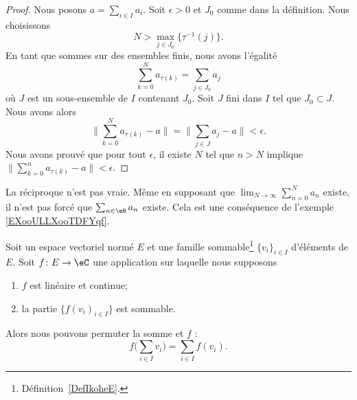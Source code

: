 \begin{proof}
	Nous posons \( a=\sum_{i\in I}a_i\). Soit \( \epsilon>0\) et \( J_0\) comme dans la définition. Nous choisissons
	\begin{equation}
		N>\max_{j\in J_0}\{ \tau^{-1}(j) \}.
	\end{equation}
	En tant que sommes sur des ensembles finis, nous avons l'égalité
	\begin{equation}
		\sum_{k=0}^Na_{\tau(k)}=\sum_{j\in J_0}a_j
	\end{equation}
	où \( J\) est un sous-ensemble de \( I\) contenant \( J_0\). Soit \( J\) fini dans \( I\) tel que \( J_0\subset J\). Nous avons alors
	\begin{equation}
		\| \sum_{k=0}^Na_{\tau(k)}-a \|=\| \sum_{j\in J}a_j-a \|<\epsilon.
	\end{equation}
	Nous avons prouvé que pour tout \( \epsilon\), il existe \( N\) tel que \( n>N\) implique \( \| \sum_{k=0}^na_{\tau(k)}-a\| <\epsilon\).
\end{proof}

La réciproque n'est pas vraie. Même en supposant que \( \lim_{N\to \infty} \sum_{n=0}^Na_n\) existe, il n'est pas forcé que \( \sum_{n\in\eN}a_n\) existe. Cela est une conséquence de l'exemple \ref{EXooULLXooTDFYqf}.


\begin{proposition}     \label{PROPooWLEDooJogXpQ}
	Soit un espace vectoriel normé \( E\) et une famille sommable\footnote{Définition~\ref{DefIkoheE}.} \( \{ v_i \}_{i\in I}\) d'éléments de \( E\). Soit \( f\colon E\to \eC\) une application sur laquelle nous supposons
	\begin{enumerate}
		\item
		      \( f\) est linéaire et continue;
		\item
		      la partie \( \{ f(v_i)_{i\in I} \} \) est sommable.
	\end{enumerate}
	Alors nous pouvons permuter la somme et \( f\) :
	\begin{equation}        \label{EQooONHXooKqIEbY}
		f\big( \sum_{i\in I}v_i \big)=\sum_{i\in I}f(v_i).
	\end{equation}
\end{proposition}

